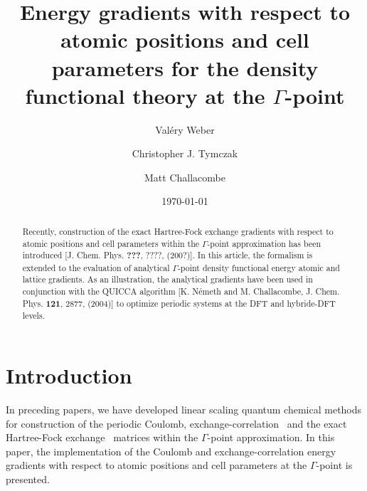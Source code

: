 \documentclass[prl,twocolumn,showpacs,twocolumngrid,superbib]{revtex4}
\begin{document}

\title{Energy gradients with respect to atomic positions and cell parameters
  for the density functional theory at the $\Gamma$-point}

\author{Val\'ery Weber}
%
\author{Christopher J. Tymczak}%
\author{Matt Challacombe}%
%

\date{\today}%

\begin{abstract}
  Recently, construction of the exact Hartree-Fock exchange
  gradients with respect to atomic positions and cell parameters
  within the $\Gamma$-point approximation
  has been introduced [J. Chem. Phys. {\bf ???}, ????, (200?)].
  In this article, the formalism is extended to the evaluation of
  analytical $\Gamma$-point density functional energy atomic and lattice gradients. 
  As an illustration, the analytical gradients have been used
  in conjunction with the QUICCA algorithm [K. N\'emeth and M. Challacombe,
  J. Chem. Phys. {\bf 121}, 2877, (2004)] to optimize periodic
  systems at the DFT and hybride-DFT levels.
\end{abstract}

\maketitle

\section{Introduction}
In preceding papers, we have developed linear scaling quantum chemical methods
for construction of the periodic Coulomb, exchange-correlation~\cite{CTymczak04a}
and the exact Hartree-Fock exchange~\cite{CTymczak04b}
matrices within the $\Gamma$-point approximation.
In this paper, the implementation of the Coulomb and exchange-correlation 
energy gradients with respect to atomic positions and cell parameters
at the $\Gamma$-point is presented.
\end{document}
